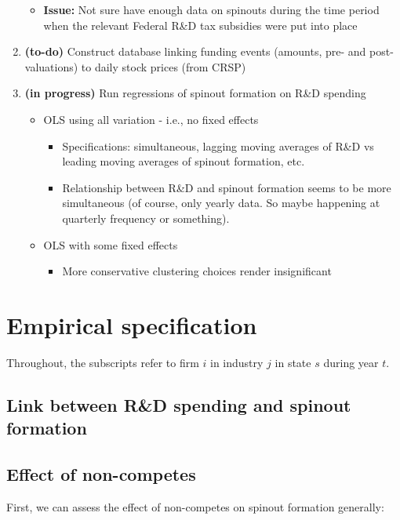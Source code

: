 \documentclass[12pt,english]{article}
\theoremstyle{remark}
\begin{document}
\begin{enumerate}
\begin{itemize}
		\item \textbf{Issue: } Not sure have enough data on spinouts during the time period when the relevant Federal R\&D tax subsidies were put into place
	\end{itemize}
	\item \textbf{(to-do)} Construct database linking funding events (amounts, pre- and post- valuations) to daily stock prices (from CRSP)
	\item \textbf{(in progress)} Run regressions of spinout formation on R\&D spending
	\begin{itemize}
		\item OLS using all variation - i.e., no fixed effects
		\begin{itemize}
			\item Specifications: simultaneous, lagging moving averages of R\&D vs leading moving averages of spinout formation, etc.
			\item Relationship between R\&D and spinout formation seems to be more simultaneous (of course, only yearly data. So maybe happening at quarterly frequency or something).
		\end{itemize}
		\item OLS with some fixed effects
		\begin{itemize}
			\item More conservative clustering choices render insignificant
		\end{itemize}
	\end{itemize}
\end{enumerate}

\section{Empirical specification}

Throughout, the subscripts refer to firm $i$ in industry $j$ in state $s$ during year $t$. 

\subsection{Link between R\&D spending and spinout formation}

\subsection{Effect of non-competes}
	
First, we can assess the effect of non-competes on spinout formation generally:
\end{document}

